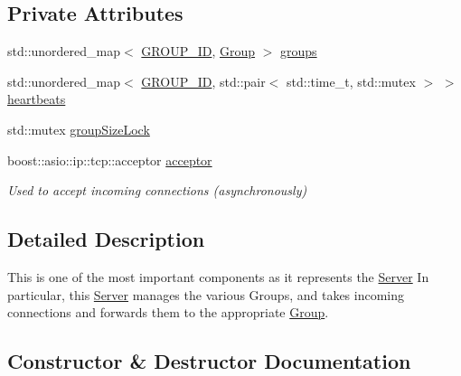 \subsection*{Private Attributes}
\begin{DoxyCompactItemize}
\item 
std\+::unordered\+\_\+map$<$ \hyperlink{namespaceshaan97_1_1sync_a34cebf175d27dfc3d82f24608f7043c1}{G\+R\+O\+U\+P\+\_\+\+ID}, \hyperlink{classshaan97_1_1sync_1_1_group}{Group} $>$ \hyperlink{classshaan97_1_1sync_1_1_server_a9c7e24eecc094689890f9dd97df3dd50}{groups}
\item 
std\+::unordered\+\_\+map$<$ \hyperlink{namespaceshaan97_1_1sync_a34cebf175d27dfc3d82f24608f7043c1}{G\+R\+O\+U\+P\+\_\+\+ID}, std\+::pair$<$ std\+::time\+\_\+t, std\+::mutex $>$ $>$ \hyperlink{classshaan97_1_1sync_1_1_server_a031f6b51241c6440b6bc452ddcd124f5}{heartbeats}
\item 
std\+::mutex \hyperlink{classshaan97_1_1sync_1_1_server_a613155fba91990f1c9e2b0852a752110}{group\+Size\+Lock}
\item 
boost\+::asio\+::ip\+::tcp\+::acceptor \hyperlink{classshaan97_1_1sync_1_1_server_abcdfb6bb878a7996b144b15415640b8e}{acceptor}
\begin{DoxyCompactList}\small\item\em Used to accept incoming connections (asynchronously) \end{DoxyCompactList}\end{DoxyCompactItemize}


\subsection{Detailed Description}
This is one of the most important components as it represents the \hyperlink{classshaan97_1_1sync_1_1_server}{Server} In particular, this \hyperlink{classshaan97_1_1sync_1_1_server}{Server} manages the various Groups, and takes incoming connections and forwards them to the appropriate \hyperlink{classshaan97_1_1sync_1_1_group}{Group}. 

\subsection{Constructor \& Destructor Documentation}
\mbox{\label{classshaan97_1_1sync_1_1_server_ac9ad7c8bb7fe2f5da5101da1297c9ae1}} 
